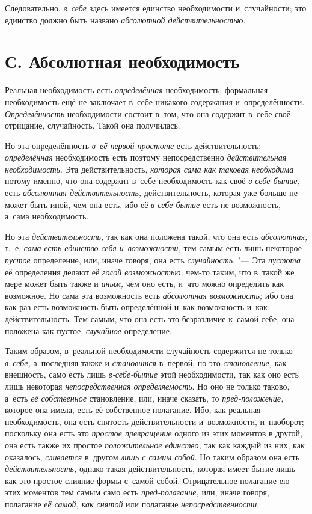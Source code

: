 Следовательно, {\em в~себе} здесь имеется единство
необходимости и~случайности; это единство должно быть названо
{\em абсолютной действительностью}.

\section[С. Абсолютная необходимость]{С. Абсолютная необходимость}

Реальная необходимость есть {\em определённая} необходимость; формальная
необходимость ещё не заключает в~себе никакого содержания и~определённости.
{\em Определённость} необходимости состоит в~том, что
она содержит в~себе своё отрицание, случайность. Такой она получилась.

Но эта определённость {\em в~её первой простоте} есть
действительность; {\em определённая} необходимость есть
поэтому непосредственно {\em действительная
необходимость}. Эта действительность, {\em которая сама
как таковая необходима} потому именно, что она содержит в~себе
необходимость как своё {\em в-себе-бытие,} есть
{\em абсолютная действительность,} действительность,
которая уже больше не может быть иной, чем она есть, ибо её
{\em в-себе-бытие} есть не возможность, а~сама необходимость.

Но эта {\em действительность,} так как она положена
такой, что она есть {\em абсолютная,} т.~е.
{\em сама есть единство себя и~возможности,} тем самым
есть лишь некоторое {\em пустое} определение, или,
иначе говоря, она есть {\em случайность}. "--- Эта
{\em пустота} её определения делают её
{\em голой возможностью,} чем-то таким, что в~такой же
мере может быть также и {\em иным,} чем оно есть, и~что
можно определить как возможное. Но сама эта возможность есть
{\em абсолютная возможность;} ибо она как раз есть
возможность быть определённой и~как возможность и~как действительность. Тем
самым, что она есть это безразличие к~самой себе, она положена как пустое,
{\em случайное} определение.

Таким образом, в~реальной необходимости случайность содержится не только
{\em в~себе,} а~последняя также и {\em становится} в~первой; но это
{\em становление,} как внешность, само есть лишь
{\em в-себе-бытие} этой необходимости, так как оно есть
лишь некоторая {\em непосредственная определяемость}.
Но оно не только таково, а~есть {\em её собственное}
становление, или, иначе сказать, то
{\em пред-положение,} которое она имела, есть её
собственное полагание. Ибо, как реальная необходимость, она есть снятость
действительности и~возможности, и~наоборот; поскольку она есть это
{\em простое превращение} одного из этих моментов в
другой, она есть также их простое {\em положительное
единство,} так как каждый из них, как оказалось,
{\em сливается} в~другом {\em лишь
с самим собой}. Но таким образом она есть
{\em действительность,} однако такая действительность,
которая имеет бытие лишь как это простое слияние формы с~самой собой.
Отрицательное полагание ею этих моментов тем самым само есть
{\em пред-полагание,} или, иначе говоря, полагание
{\em её самой, как снятой}
или полагание {\em непосредственности}.

